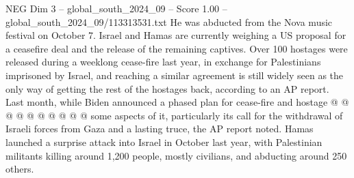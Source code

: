 \begin{textsample}{NEG Dim 3 – global\_south\_2024\_09 – Score 1.00 – global\_south\_2024\_09/113313531.txt}
He was abducted from the Nova music festival on October 7.
Israel and Hamas are currently weighing a US proposal for a ceasefire deal and the release of the remaining captives.
Over 100 hostages were released during a weeklong cease-fire last year, in exchange for Palestinians imprisoned by Israel, and reaching a similar agreement is still widely seen as the only way of getting the rest of the hostages back, according to an AP report.
Last month, while Biden announced a phased plan for cease-fire and hostage @ @ @ @ @ @ @ @ @ @ some aspects of it, particularly its call for the withdrawal of Israeli forces from Gaza and a lasting truce, the AP report noted.
Hamas launched a surprise attack into Israel in October last year, with Palestinian militants killing around 1,200 people, mostly civilians, and abducting around 250 others.

\end{textsample}
